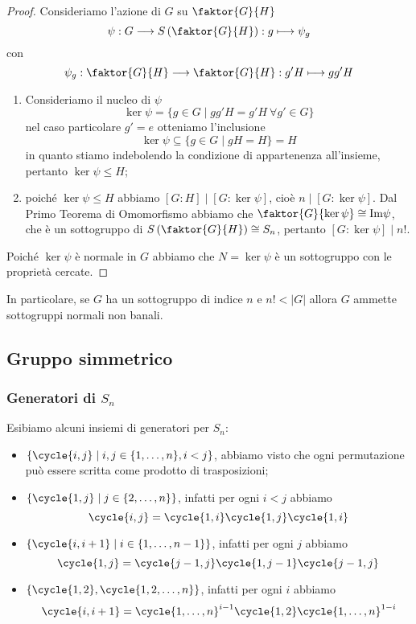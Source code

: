 \documentclass[11pt]{scrartcl}
\begin{document}
\begin{proof}
    Consideriamo l'azione di $G$ su $\faktor{G}{H}$
    \[
        \psi: G\longrightarrow S\left(\faktor{G}{H}\right):g\longmapsto \psi_g
    \]
    con
    \[
        \psi_g:\faktor{G}{H}\longrightarrow\faktor{G}{H} : g'H\longmapsto gg'H
    \]
    \begin{enumerate}[(1)]
        \item Consideriamo il nucleo di $\psi$
        \[
            \ker\psi = \{g \in G\mid gg'H = g'H~\forall g' \in G\}
        \]
        nel caso particolare $g' = e$ otteniamo l'inclusione
        \[
            \ker\psi \subseteq \{g \in G \mid gH = H\} = H
        \]
        in quanto stiamo indebolendo la condizione di appartenenza all'insieme,
        pertanto $\ker\psi \leqslant H$;
        \item poiché $\ker\psi \leqslant H$ abbiamo $[G:H]\mid [G:\ker\psi]$, cioè
        $n \mid [G:\ker\psi]$. Dal Primo Teorema di Omomorfismo abbiamo che
        $\faktor{G}{\ker\psi} \cong \mathrm{Im\psi}$, che è un sottogruppo
        di $S\left(\faktor{G}{H}\right)\cong S_n$, pertanto $[G:\ker\psi]\mid n!$.
    \end{enumerate}
    Poiché $\ker\psi$ è normale in $G$ abbiamo che $N = \ker\psi$ è un sottogruppo
    con le proprietà cercate.
\end{proof}

\begin{remark}
    In particolare, se $G$ ha un sottogruppo di indice $n$ e $n! < |G|$
    allora $G$ ammette sottogruppi normali non banali.
\end{remark}

\newpage

\subsection{Gruppo simmetrico}

\subsubsection{Generatori di $S_n$}

Esibiamo alcuni insiemi di generatori per $S_n$:

\begin{itemize}
    \item $\{\cycle{i, j} \mid i, j \in\{1, \ldots, n\}, i < j\}$, abbiamo visto 
    che ogni permutazione può essere scritta come prodotto di trasposizioni;
    \item $\{\cycle{1, j}\mid j \in \{2, \ldots, n\}\}$, infatti per ogni $i<j$ abbiamo
    \[
        \cycle{i, j} = \cycle{1, i}\cycle{1, j}\cycle{1, i}
    \]
    \item $\{\cycle{i, i + 1}\mid i \in\{1, \ldots, n - 1\}\}$,
    infatti per ogni $j$ abbiamo 
    \[
        \cycle{1, j} = \cycle{j - 1, j}\cycle{1, j - 1}\cycle{j - 1, j}
    \]
    \item $\{\cycle{1, 2}, \cycle{1, 2, \ldots, n}\}$, infatti per ogni
    $i$ abbiamo 
    \[
        \cycle{i, i + 1} = \cycle{1, \ldots, n}^{i - 1}\cycle{1, 2}\cycle{1, \ldots, n}^{1 - i}
    \]
\end{itemize}
\end{document}

